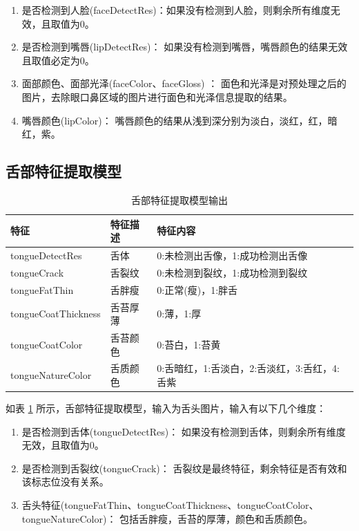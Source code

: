\begin{enumerate}
    \item 是否检测到人脸(faceDetectRes)：如果没有检测到人脸，则剩余所有维度无效，且取值为0。

    \item 是否检测到嘴唇(lipDetectRes)： 如果没有检测到嘴唇，嘴唇颜色的结果无效且取值必定为0。

    \item 面部颜色、面部光泽(faceColor、faceGloss) ： 面色和光泽是对预处理之后的图片，去除眼口鼻区域的图片进行面色和光泽信息提取的结果。

    \item 嘴唇颜色(lipColor)： 嘴唇颜色的结果从浅到深分别为淡白，淡红，红，暗红，紫。
\end{enumerate}


\subsection{舌部特征提取模型}

\begin{table}[h]
    \centering
    \begin{tabular}{lll}
        \toprule
        特征 & 特征描述 & 特征内容 \\ 
        \midrule
        tongueDetectRes & 舌体 & 0:未检测出舌像，1:成功检测出舌像 \\
        tongueCrack & 舌裂纹 & 0:未检测到裂纹，1:成功检测到裂纹 \\ 
        tongueFatThin & 舌胖瘦 & 0:正常(瘦)，1:胖舌 \\
        tongueCoatThickness & 舌苔厚薄 & 0:薄，1:厚 \\
        tongueCoatColor & 舌苔颜色 & 0:苔白，1:苔黄 \\
        tongueNatureColor & 舌质颜色 & 0:舌暗红，1:舌淡白，2:舌淡红，3:舌红，4:舌紫\\
        \bottomrule
    \end{tabular}

    \caption{舌部特征提取模型输出}
    \label{tab:tongue-feature}
\end{table}

如表 \ref{tab:tongue-feature} 所示，舌部特征提取模型，输入为舌头图片，输入有以下几个维度：

\begin{enumerate}
    \item 是否检测到舌体(tongueDetectRes)： 如果没有检测到舌体，则剩余所有维度无效，且取值为0。

    \item 是否检测到舌裂纹(tongueCrack)： 舌裂纹是最终特征，剩余特征是否有效和该标志位没有关系。

    \item 舌头特征(tongueFatThin、tongueCoatThickness、tongueCoatColor、tongueNatureColor)： 包括舌胖瘦，舌苔的厚薄，颜色和舌质颜色。

\end{enumerate}


